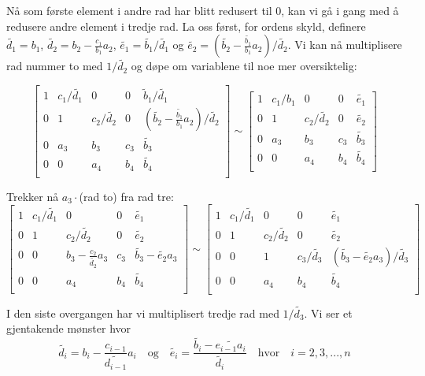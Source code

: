 \documentclass{article}
\begin{document}
Nå som første element i andre rad har blitt redusert til 0, kan vi gå i gang med å redusere andre element i tredje rad. La oss først, for ordens skyld, definere $\tilde{d_1} = b_1$, $\tilde{d_2} = b_2 - \frac{c_1}{b_1}a_2$, $\tilde{e_1} = \tilde{b_1}/\tilde{d_1}$ og $\tilde{e_2} =  (\tilde{b_2} - \frac{\tilde{b_1}}{b_1}a_2)/\tilde{d_2}$. Vi kan nå multiplisere rad nummer to med $1/\tilde{d_2}$ og døpe om variablene til noe mer oversiktelig: 

\[
\left[
\begin{array}{cccc|c}
1 & c_1/\tilde{d_1} & 0 & 0 & \tilde{b}_1/\tilde{d_1} \\
 0 & 1  &c_2/\tilde{d_2} &0 & (\tilde{b_2} - \frac{\tilde{b_1}}{b_1}a_2)/\tilde{d_2}\\
  0 & a_3 & b_3 & c_3 & \tilde{b_3}\\
  0 & 0 & a_4 & b_4 & \tilde{b_4}\\
\end{array}
\right] \sim
\left[
\begin{array}{cccc|c}
1 & c_1/b_1 & 0 & 0 & \tilde{e_1} \\
 0 & 1  &c_2/\tilde{d_2} &0 &\tilde{e_2}\\
  0 & a_3 & b_3 & c_3 & \tilde{b_3}\\
  0 & 0 & a_4 & b_4 & \tilde{b_4}\\
\end{array}
\right]
\]

Trekker nå $a_3 \cdot$(rad to) fra rad tre:
\[
\left[
\begin{array}{cccc|c}
1 & c_1/\tilde{d_1} & 0 & 0 & \tilde{e_1} \\
 0 & 1  &c_2/\tilde{d_2} &0 &\tilde{e_2}\\
  0 & 0 & b_3 - \frac{c_2}{\tilde{d_2}}a_3 & c_3 & \tilde{b_3} - \tilde{e_2}a_3\\
  0 & 0 & a_4 & b_4 & \tilde{b_4}\\
\end{array}
\right] \sim
\left[
\begin{array}{cccc|c}
1 & c_1/\tilde{d_1} & 0 & 0 & \tilde{e_1} \\
 0 & 1  &c_2/\tilde{d_2} &0 &\tilde{e_2}\\
  0 & 0 & 1 & c_3/\tilde{d_3} &  (\tilde{b_3} - \tilde{e_2}a_3)/\tilde{d_3}\\
  0 & 0 & a_4 & b_4 & \tilde{b_4}\\
\end{array}
\right]
\]

I den siste overgangen har vi multiplisert tredje rad med $1/\tilde{d_3}$. Vi ser et gjentakende mønster hvor 
\begin{equation}
\tilde{d_i}= b_i - \frac{c_{i-1}}{\tilde{d_{i-1}}}a_i \quad \textrm{og} \quad \tilde{e_i}=\frac{\tilde{b_i}-\tilde{e_{i-1}a_i}}{\tilde{d_i}} \quad \textrm{hvor} \quad i = 2,3,...,n
\end{equation}
\end{document}
